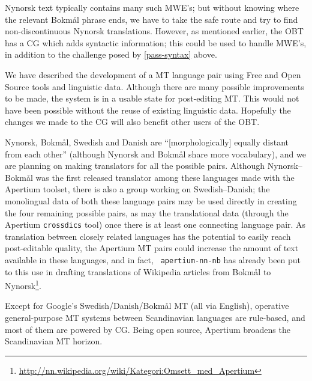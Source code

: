 \documentclass[11pt]{article}
\newcommand{\comment}[1]{\textbf{SKRIV} {\it #1}}
\renewcommand{\comment}[1]{}
\begin{document}
Nynorsk text typically contains many such MWE's; but without knowing
where the relevant Bokmål phrase ends, we have to take the safe route
and try to find non-discontinuous Nynorsk translations. However, as
mentioned earlier, the OBT has a CG which adds syntactic information;
this could be used to handle MWE's, in addition to the challenge posed
by \ref{pass-syntax} above.

\comment{ noko om at nn-nb.po kan nyttast som TMX med Apertium?}

We have described the development of a MT language
pair using Free and Open Source tools and linguistic data. Although
there are many possible improvements to be made, the system is in a
usable state for post-editing MT. This would not have been possible
without the reuse of existing linguistic data. Hopefully the changes
we made to the CG will also benefit other users of the OBT.

Nynorsk, Bokmål, Swedish and Danish are ``[morphologically] equally
distant from each other'' \citep[p.~1]{everson2000sln} (although
Nynorsk and Bokmål share more vocabulary), and we are planning on
making translators for all the possible pairs.  Although
Nynorsk–Bokmål was the first released translator among these languages
made with the Apertium toolset, there is also a group working on
Swedish–Danish; the monolingual data of both these language pairs may
be used directly in creating the four remaining possible pairs, as may
the translational data (through the Apertium {\tt \small  crossdics} tool)
once there is at least one connecting language pair. As translation
between closely related languages has the potential to easily reach
post-editable quality, the Apertium MT pairs could increase the amount
of text available in these languages, and in fact, {\tt \small 
  apertium-nn-nb} has already been put to this use in drafting
translations of Wikipedia articles from Bokmål to
Nynorsk\footnote{\href{http://nn.wikipedia.org/wiki/Kategori:Omsett_med_Apertium}{http://nn.wikipedia.org/wiki/Kategori:Omsett\_med\_Apertium}}.

Except for Google's Swedish/Danish/Bokmål MT (all via English),
operative general-purpose MT systems between Scandinavian languages
are rule-based, and most of them are powered by CG.  Being open
source, Apertium broadens the Scandinavian MT horizon.

\end{document}
